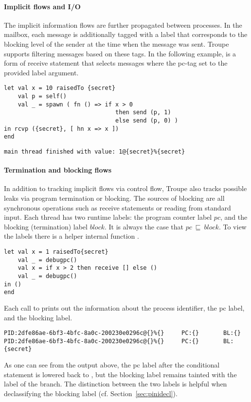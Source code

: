 \paragraph{Implicit flows and I/O}
The implicit information flows are further propagated between processes. 
In the mailbox, each message is additionally tagged with a label that 
corresponds to the blocking level of the sender at the time when the message was sent.
Troupe supports filtering messages based on these tags.
In the following example,  is a form of receive statement that selects messages
where the pc-tag set to the provided label argument.

\begin{lstlisting}
let val x = 10 raisedTo {secret}
    val p = self()
    val _ = spawn ( fn () => if x > 0 
    							then send (p, 1) 
    							else send (p, 0) )
in rcvp ({secret}, [ hn x => x ])
end
\end{lstlisting}
\begin{verbatim}
main thread finished with value: 1@{secret}%{secret}
\end{verbatim}


\paragraph{Termination and blocking flows} 
In addition to tracking implicit flows via control flow, Troupe also 
tracks possible leaks via program termination or blocking.
The sources of blocking are all synchronous operations such as receive statements or reading from standard input. 
Each thread has two runtime labels: the program counter label $\mathit{pc}$, and 
the blocking (termination) label $\mathit{block}$. It is always the case that 
$\mathit{pc}~\sqsubseteq~\mathit{block}$. To view the labels there is a 
helper internal function .
\begin{lstlisting}
let val x = 1 raisedTo{secret}
    val _ = debugpc() 
    val x = if x > 2 then receive [] else () 
    val _ = debugpc() 
in () 
end    
\end{lstlisting}

Each call to  prints out the information about the process identifier,
the pc label, and the blocking label.
\begin{verbatim}
PID:2dfe86ae-6bf3-4bfc-8a0c-200230e0296c@{}%{}     PC:{}       BL:{}                
PID:2dfe86ae-6bf3-4bfc-8a0c-200230e0296c@{}%{}     PC:{}       BL:{secret}           
\end{verbatim}
As one can see from the output above, the pc label after the conditional
statement is lowered back to \lev{}, but the blocking label remains tainted 
with the label of the branch. The distinction between the two labels
is helpful when declassifying the blocking label (cf. Section~\ref{sec:pinidecl}).






